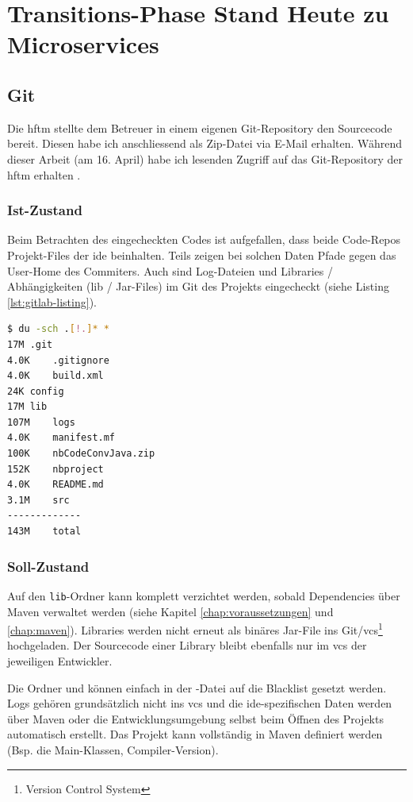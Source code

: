 \chapter{Transitions-Phase Stand Heute zu Microservices}
\section{Git}
\label{chap:tranition-git}
Die \acrshort{hftm} stellte dem Betreuer in einem eigenen Git-Repository den Sourcecode bereit. Diesen habe ich anschliessend als Zip-Datei via E-Mail erhalten. Während dieser Arbeit (am 16. April) habe ich lesenden Zugriff auf das Git-Repository der \acrshort{hftm} erhalten \cite{gitlab.com/solidus/hefei}. 

\subsection{Ist-Zustand}
Beim Betrachten des eingecheckten Codes ist aufgefallen, dass beide Code-Repos Projekt-Files der \acrshort{ide} beinhalten. Teils zeigen bei solchen Daten Pfade gegen das User-Home des Commiters. Auch sind Log-Dateien und Libraries / Abhängigkeiten (lib / Jar-Files) im Git des Projekts eingecheckt (siehe Listing \ref{lst:gitlab-listing}). 
\begin{lstlisting}[caption={Listing der Daten im Git-Repository 'gitlab.com/solidus/hefei'},language=Bash, columns=fixed,label={lst:gitlab-listing}]
$ du -sch .[!.]* *
17M	.git
4.0K	.gitignore
4.0K	build.xml
24K	config
17M	lib
107M	logs
4.0K	manifest.mf
100K	nbCodeConvJava.zip
152K	nbproject
4.0K	README.md
3.1M	src
-------------
143M	total
\end{lstlisting}
\subsection{Soll-Zustand}
Auf den \verb|lib|-Ordner kann komplett verzichtet werden, sobald Dependencies über Maven verwaltet werden (siehe Kapitel \ref{chap:voraussetzungen} und \ref{chap:maven}). Libraries werden nicht erneut als binäres Jar-File ins Git/\acrshort{vcs}\footnote{Version Control System} hochgeladen. Der Sourcecode einer Library bleibt ebenfalls nur im \acrshort{vcs} der jeweiligen Entwickler.

Die Ordner  und  können einfach in der -Datei auf die Blacklist gesetzt werden. Logs gehören grundsätzlich nicht ins \acrshort{vcs} und die \acrshort{ide}-spezifischen Daten werden über Maven oder die Entwicklungsumgebung selbst beim Öffnen des Projekts automatisch erstellt. Das Projekt kann vollständig in Maven definiert werden (Bsp. die Main-Klassen, Compiler-Version).

